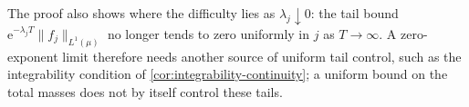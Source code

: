 The proof also shows where the difficulty lies as $\lambda_j\downarrow0$: the tail bound $\mathrm{e}^{-\lambda_jT}\|f_j\|_{L^1(\mu)}$ no longer tends to zero uniformly in $j$ as $T\to\infty$. A zero-exponent limit therefore needs another source of uniform tail control, such as the integrability condition of \cref{cor:integrability-continuity}; a uniform bound on the total masses does not by itself control these tails.








